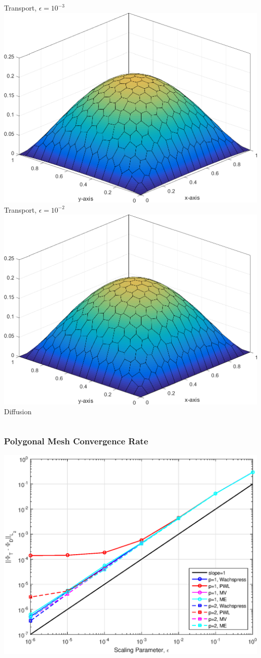 \documentclass[compress,10pt]{beamer}
\begin{document}
\begin{frame}[t]
{\begin{columns}
Transport, $\epsilon=10^{-3}$
\centering
{}\includegraphics[width=0.75\columnwidth]{images/Sq_poly_MAXENT_k=2_ep=1e-2.png}\\
Transport, $\epsilon=10^{-2}$
{}\includegraphics[width=0.75\columnwidth]{images/Sq_poly_MAXENT_k=2.png}\\
Diffusion
\end{columns}
}
{
\frametitle{Polygonal Mesh Convergence Rate}
\centering
{}\includegraphics[width=0.80\columnwidth]{images/DLConvergenceError_SqPoly.eps}
}
\end{frame}
\typeout{***********************************************************************************}
\end{document}
